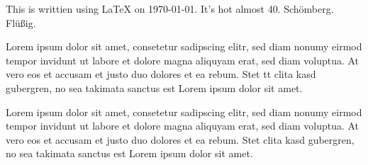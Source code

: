 \begin{custom-abstract}

This is writtien using \LaTeX{} on \today . It's hot almost 40\textcelsius.
Sch\"omberg. Fl\"u\ss ig.

Lorem ipsum dolor sit amet, consetetur sadipscing elitr, sed diam nonumy eirmod tempor invidunt ut labore et dolore magna aliquyam erat, sed diam voluptua. At vero eos et accusam et justo duo dolores et ea rebum. Stet \gls{tt} clita kasd gubergren, no sea takimata sanctus est Lorem ipsum dolor sit amet.

Lorem ipsum dolor sit amet, consetetur sadipscing elitr, sed diam nonumy eirmod tempor invidunt ut labore et dolore magna aliquyam erat, sed diam voluptua. At vero eos et accusam et justo duo dolores et ea rebum. Stet clita kasd gubergren, no sea takimata sanctus est Lorem ipsum dolor sit amet.

\end{custom-abstract}
